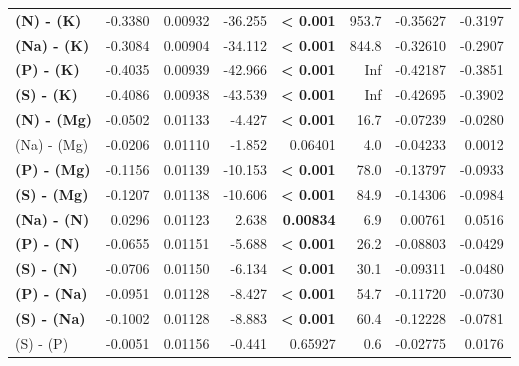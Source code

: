 \begin{table}[H]
\begin{tabular}[t]{>{}lrrr>{}rrrr}
\textbf{(N) - (K)} & -0.3380 & 0.00932 & -36.255 & \textbf{< 0.001} & 953.7 & -0.35627 & -0.3197\\
\textbf{(Na) - (K)} & -0.3084 & 0.00904 & -34.112 & \textbf{< 0.001} & 844.8 & -0.32610 & -0.2907\\
\textbf{(P) - (K)} & -0.4035 & 0.00939 & -42.966 & \textbf{< 0.001} & Inf & -0.42187 & -0.3851\\
\textbf{(S) - (K)} & -0.4086 & 0.00938 & -43.539 & \textbf{< 0.001} & Inf & -0.42695 & -0.3902\\
\textbf{(N) - (Mg)} & -0.0502 & 0.01133 & -4.427 & \textbf{< 0.001} & 16.7 & -0.07239 & -0.0280\\
(Na) - (Mg) & -0.0206 & 0.01110 & -1.852 & 0.06401 & 4.0 & -0.04233 & 0.0012\\
\textbf{(P) - (Mg)} & -0.1156 & 0.01139 & -10.153 & \textbf{< 0.001} & 78.0 & -0.13797 & -0.0933\\
\textbf{(S) - (Mg)} & -0.1207 & 0.01138 & -10.606 & \textbf{< 0.001} & 84.9 & -0.14306 & -0.0984\\
\textbf{(Na) - (N)} & 0.0296 & 0.01123 & 2.638 & \textbf{0.00834} & 6.9 & 0.00761 & 0.0516\\
\textbf{(P) - (N)} & -0.0655 & 0.01151 & -5.688 & \textbf{< 0.001} & 26.2 & -0.08803 & -0.0429\\
\textbf{(S) - (N)} & -0.0706 & 0.01150 & -6.134 & \textbf{< 0.001} & 30.1 & -0.09311 & -0.0480\\
\textbf{(P) - (Na)} & -0.0951 & 0.01128 & -8.427 & \textbf{< 0.001} & 54.7 & -0.11720 & -0.0730\\
\textbf{(S) - (Na)} & -0.1002 & 0.01128 & -8.883 & \textbf{< 0.001} & 60.4 & -0.12228 & -0.0781\\
(S) - (P) & -0.0051 & 0.01156 & -0.441 & 0.65927 & 0.6 & -0.02775 & 0.0176\\
\bottomrule
\end{tabular}
\end{table}
